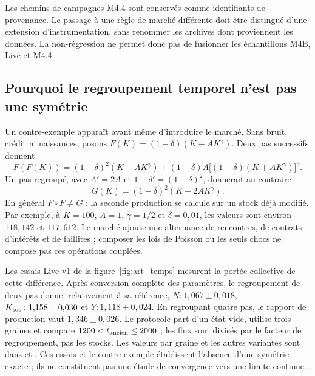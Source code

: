 Les chemins de campagnes M4.4 sont conservés comme identifiants de
provenance. Le passage à une règle de marché différente doit être
distingué d'une extension d'instrumentation, sans renommer les archives
dont proviennent les données. La non-régression ne
permet donc pas de fusionner les échantillons M4B, Live et M4.4.

\subsection{Pourquoi le regroupement temporel n'est pas une symétrie}
\label{sec:composition_temps}
Un contre-exemple apparaît avant même d'introduire le marché. Sans bruit,
crédit ni naissances, posons $F(K)=(1-\delta)(K+AK^\gamma)$.
Deux pas successifs donnent
\[
F(F(K))=(1-\delta)^2(K+AK^\gamma)
 +(1-\delta)A\big[(1-\delta)(K+AK^\gamma)\big]^\gamma.
\]
Un pas regroupé, avec $A'=2A$ et
$1-\delta'=(1-\delta)^2$, donnerait au contraire
\[
G(K)=(1-\delta)^2(K+2AK^\gamma).
\]
En général $F\circ F\ne G$ : la seconde production se calcule sur
un stock déjà modifié. Par exemple, à $K=100$, $A=1$,
$\gamma=1/2$ et $\delta=0{,}01$, les valeurs sont environ
$118{,}142$ et $117{,}612$. Le marché ajoute une alternance de
rencontres, de contrats, d'intérêts et de faillites ; composer les lois
de Poisson ou les seuls chocs ne compose pas ces opérations couplées.

Les essais Live-v1 de la figure~\ref{fig:art_temps} mesurent la portée
collective de cette différence. Après conversion complète des paramètres,
le regroupement de deux pas donne, relativement à sa référence,
$N:1{,}067\pm0{,}018$, $K_{\rm tot}:1{,}158\pm0{,}030$ et
$Y:1{,}118\pm0{,}024$. En regroupant quatre pas, le rapport de
production vaut $1{,}346\pm0{,}026$. Le protocole part d'un état vide,
utilise trois graines et compare $1200<t_{\rm ancien}\le2000$ ;
les flux sont divisés par le facteur de regroupement, pas les stocks.
Les valeurs par graine et les autres variantes sont dans
 et
. Ces essais et le contre-exemple
établissent l'absence d'une symétrie exacte ; ils ne constituent pas
une étude de convergence vers une limite continue.

